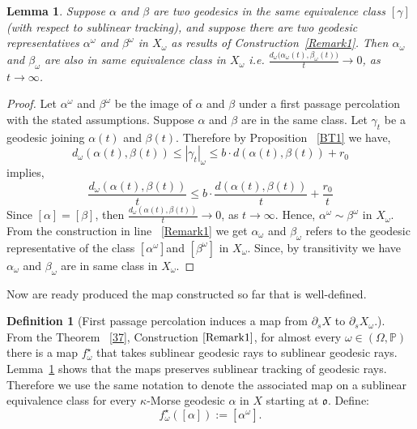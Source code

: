 \documentclass[12 pt]{amsart}
\newtheorem{lemma}[theorem]{Lemma}
\theoremstyle{definition}
\newtheorem{definition}[theorem]{Definition}
\theoremstyle{remark}
\newcommand{\ps}{{\partial_s}}
\begin{document}
\begin{lemma} \label{welldefined}
Suppose $\alpha$ and $\beta$ are two geodesics in the same equivalence class $[\gamma]$ (with respect to sublinear tracking), and suppose there are two geodesic representatives $\alpha^\omega$ and $\beta^\omega$ in $X_\omega$ as results of Construction~\ref{Remark1}. Then
    $\alpha_{\omega}$ and $\beta_{\omega}$ are also in same equivalence class in $X_\omega$ i.e. $\frac{d_\omega\big(\alpha_{\omega}(t),\beta_{\omega}(t)\big)}{t} \rightarrow 0$, as $t \rightarrow \infty$.
\end{lemma}
\begin{proof}
   Let $\alpha^\omega$ and $\beta^\omega$ be the image of $\alpha$ and $\beta$ under a first passage percolation with the stated assumptions. Suppose $\alpha$ and $\beta$ are in the same class. Let $\gamma_t$ be a geodesic joining  $\alpha(t)$ and $\beta(t)$. Therefore by Proposition ~\ref{BT1} we have,  \[d_\omega(\alpha(t),\beta(t)) \leq |\gamma_t|_\omega \leq b\cdot d(\alpha(t),\beta(t))+r_0\] implies,\[\frac{d_\omega(\alpha(t),\beta(t))}{t}\leq b\cdot \frac{d(\alpha(t),\beta(t))}{t}+\frac{r_0}{t}\]
   Since $[\alpha]=[\beta]$, then $\frac{d_\omega(\alpha(t),\beta(t))}{t}\rightarrow0$, as $t \rightarrow\infty$. Hence, $\alpha^\omega \sim \beta^\omega$ in $X_\omega$. From the construction in line ~\ref{Remark1} we get $\alpha_{\omega}$ and $\beta_{\omega}$ refers to the geodesic representative of the class $[\alpha^\omega]$and $[\beta^\omega]$ in $X_\omega$. Since,   by transitivity we have $\alpha_{\omega}$ and $\beta_{\omega}$ are in same class in $X_\omega$.
\end{proof}

Now are ready produced the map constructed so far that is well-defined.
\begin{definition}[First passage percolation induces a map from $\ps X$ to $\ps X_\omega$.]\label{themap}
 From the Theorem ~\ref{37}, Construction$~\ref{Remark1}$, for almost every $\omega \in (\Omega, \mathbb{P})$ there is a  map $f_\omega^{\star}$ that takes sublinear geodesic rays to sublinear geodesic rays. Lemma~\ref{welldefined} shows that the maps preserves sublinear tracking of geodesic rays. Therefore we use the same notation to denote the associated map on a sublinear equivalence class  for every $\kappa$-Morse geodesic $\alpha$ in $X$ starting at $\mathfrak{o}$. Define:
 \[f_\omega^{\star}([\alpha]):=[\alpha^\omega].\]
 

\end{definition}
\end{document}
